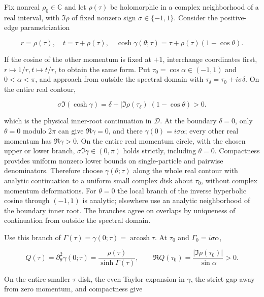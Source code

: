 \documentclass[11pt,a4paper]{article}
\numberwithin{equation}{section}
\theoremstyle{plain}
\theoremstyle{definition}
\begin{document}
Fix nonreal \(\rho_0\in\mathbb C\) and let \(\rho(\tau)\) be holomorphic in a complex neighborhood of a real interval, with \(\Im\rho\) of fixed nonzero sign \(\sigma\in\{-1,1\}\). Consider the positive-edge parametrization

\begin{equation}
r=\rho(\tau),\quad t=\tau+\rho(\tau),\quad \cosh\gamma(\theta;\tau)=\tau+\rho(\tau)(1-\cos\theta).
\label{eq:A21}
\end{equation}

If the cosine of the other momentum is fixed at \(+1\), interchange coordinates first, \(r\mapsto1/r,t\mapsto t/r\), to obtain the same form. Put \(\tau_0=\cos\alpha\in(-1,1)\) and \(0<\alpha<\pi\), and approach from outside the spectral domain with \(\tau_\delta=\tau_0+i\sigma\delta\). On the entire real contour,

\[\sigma\Im(\cosh\gamma)=\delta+|\Im\rho(\tau_\delta)|(1-\cos\theta)>0.\]

which is the physical inner-root continuation in \(\mathcal D\). At the boundary \(\delta=0\), only \(\theta=0\) modulo \(2\pi\) can give \(\Re\gamma=0\), and there \(\gamma(0)=i\sigma\alpha\); every other real momentum has \(\Re\gamma>0\). On the entire real momentum circle, with the chosen upper or lower branch, \(\sigma\Im\gamma\in(0,\pi)\) holds strictly, including \(\theta=0\). Compactness provides uniform nonzero lower bounds on single-particle and pairwise denominators. Therefore choose \(\gamma(\theta;\tau)\) along the whole real contour with analytic continuation to a uniform small complex disk about \(\tau_0\), without complex momentum deformations. For \(\theta=0\) the local branch of the inverse hyperbolic cosine through \((-1,1)\) is analytic; elsewhere use an analytic neighborhood of the boundary inner root. The branches agree on overlaps by uniqueness of continuation from outside the spectral domain.

Use this branch of \(\Gamma(\tau)=\gamma(0;\tau)=\operatorname{arcosh}\tau\). At \(\tau_0\) and \(\Gamma_0=i\sigma\alpha\),

\begin{equation}
Q(\tau)=\partial_\theta^2\gamma(0;\tau)=\frac{\rho(\tau)}{\sinh\Gamma(\tau)},\qquad \Re Q(\tau_0)=\frac{|\Im\rho(\tau_0)|}{\sin\alpha}>0.
\label{eq:A22}
\end{equation}

On the entire smaller \(\tau\) disk, the even Taylor expansion in \(\gamma\), the strict gap away from zero momentum, and compactness give
\end{document}
